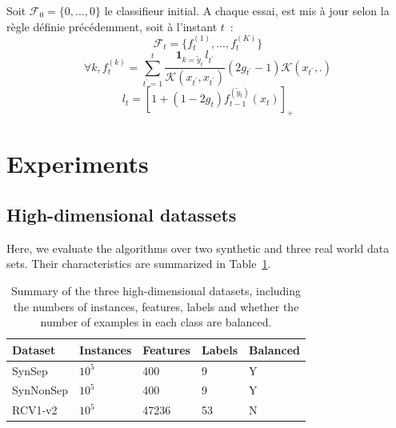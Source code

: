 \documentclass[twocolumn]{article}
\begin{document}
Soit $\mathcal{F}_0=\{0, ..., 0\}$ le classifieur initial. A chaque essai, est mis à jour selon la règle définie précédemment, soit à l'instant $t$~:
$$\mathcal{F}_t = \{f^{(1)}_t, ..., f^{(K)}_t\}$$
$$\forall k, f^{(k)}_t = \sum_{t^\prime = 1} ^t  \frac {\mathbf{1}_{k=\tilde{y}_{t^\prime}}l_{t^\prime}}{\mathcal{K}(x_{t^\prime},x_{t^\prime})} (2g_{t^\prime} - 1)\mathcal{K}(x_{t^\prime},.)$$
$$ l_t = [1 + (1-2g_t) f_{t-1}^{(\tilde{y}_t)}(x_t)]_+$$

\section{Experiments}

\subsection{High-dimensional datassets}
\label{subsec:BPAE}
Here, we evaluate the algorithms over two synthetic and three real world data sets. Their characteristics are summarized in Table~\ref{table:mce}.

\begin{table}[h]
	\caption{Summary of the three high-dimensional datasets, including the numbers of instances, features, labels and whether the number of examples in each class are balanced.}
	\label{table:mce}
	\begin{center}
		\begin{tabular}{l l l l l}
			{\bf Dataset}  & {\bf Instances} & {\bf Features} & {\bf Labels}& {\bf Balanced}\\
			\hline
			SynSep & $10^5$ 	& 400 	& 9 & Y\\
			
			SynNonSep & $10^5$ & 400 	& 9 & Y\\
			
			RCV1-v2  & $10^5$ 	& 47236 	& 53 & N\\
			
			
		\end{tabular}
	\end{center}
\end{table}
\end{document}
